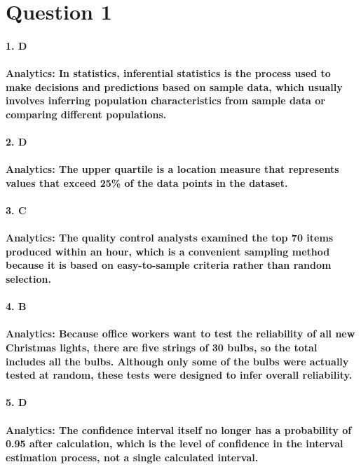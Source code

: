 \section{Question 1}
% 
% 
% 
% 
\paragraph{1. D}
\paragraph{\textbf{Analytics:} In statistics, inferential statistics is the process used to make decisions and predictions based on sample data, which usually involves inferring population characteristics from sample data or comparing different populations.}
% 
% 
% 
% 
\paragraph{2. D}
\paragraph{\textbf{Analytics:} The upper quartile is a location measure that represents values that exceed 25\% of the data points in the dataset.}
% 
% 
% 
\paragraph{3. C}
\paragraph{\textbf{Analytics:} The quality control analysts examined the top 70 items produced within an hour, which is a convenient sampling method because it is based on easy-to-sample criteria rather than random selection.}
% 
% 
% 
\paragraph{4. B}
\paragraph{\textbf{Analytics:} Because office workers want to test the reliability of all new Christmas lights, there are five strings of 30 bulbs, so the total includes all the bulbs. Although only some of the bulbs were actually tested at random, these tests were designed to infer overall reliability.}
% 
% 
% 
\paragraph{5. D}
\paragraph{\textbf{Analytics:} The confidence interval itself no longer has a probability of 0.95 after calculation, which is the level of confidence in the interval estimation process, not a single calculated interval.}
% 
% 
% 
% 
% 